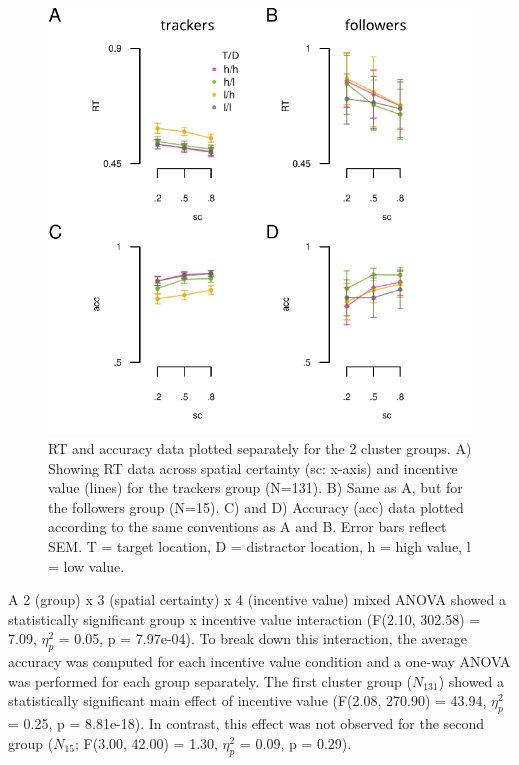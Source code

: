 \documentclass[11pt,halfline,a4paper,]{ouparticle}
\begin{document}
\begin{figure}[p]

{\centering \includegraphics[width=1\linewidth]{../images/doc-clust-grp-behav_rt-acc} 

}

\caption{RT and accuracy data plotted separately for the 2 cluster groups. A) Showing RT data across spatial certainty (sc: x-axis) and incentive value (lines) for the trackers group (N=131). B) Same as A, but for the followers group (N=15). C) and D) Accuracy (acc) data plotted according to the same conventions as A and B. Error bars reflect SEM. T = target location, D = distractor location, h = high value, l = low value.}\label{fig:clustgrpRTacc}
\end{figure}

A 2 (group) x 3 (spatial certainty) x 4 (incentive value) mixed ANOVA showed a statistically significant group x incentive value interaction (F(2.10, 302.58) = 7.09, \(\eta_{p}^2\) = 0.05, p = 7.97e-04). To break down this interaction, the average accuracy was computed for each incentive value condition and a one-way ANOVA was performed for each group separately. The first cluster group (\(N_{131}\)) showed a statistically significant main effect of incentive value (F(2.08, 270.90) = 43.94, \(\eta_{p}^2\) = 0.25, p = 8.81e-18). In contrast, this effect was not observed for the second group (\(N_{15}\); F(3.00, 42.00) = 1.30, \(\eta_{p}^2\) = 0.09, p = 0.29).
\end{document}

